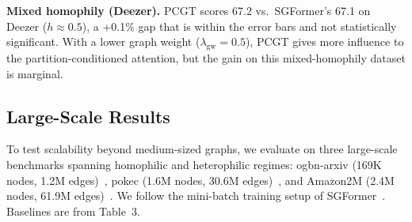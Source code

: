 \textbf{Mixed homophily (Deezer).} PCGT scores 67.2 vs.\ SGFormer's 67.1 on Deezer ($h \approx 0.5$), a +0.1\% gap that is within the error bars and not statistically significant. With a lower graph weight ($\lambda_{\text{gw}}=0.5$), PCGT gives more influence to the partition-conditioned attention, but the gain on this mixed-homophily dataset is marginal.

\subsection{Large-Scale Results}

To test scalability beyond medium-sized graphs, we evaluate on three large-scale benchmarks spanning homophilic and heterophilic regimes: ogbn-arxiv (169K nodes, 1.2M edges)~\citep{hu2020ogb}, pokec (1.6M nodes, 30.6M edges)~\citep{lim2021large}, and Amazon2M (2.4M nodes, 61.9M edges)~\citep{wu2022nodeformer}. We follow the mini-batch training setup of SGFormer~\citep{wu2023sgformer}. Baselines are from \citet{wu2023sgformer} Table~3.

\begin{table}[t]
\centering
\small
{}%
\caption{Large-scale node classification accuracy (\%). Baselines from~\citet{wu2023sgformer} Table~3. PCGT: 10 runs (arxiv), 3 runs (pokec, Amazon2M), highest test accuracy during training.}
\label{tab:largescale}
\end{table}

